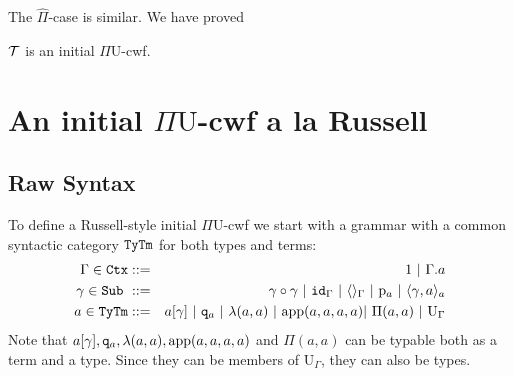 \documentclass{lmcs}
\def\UU{\mathrm{U}}
\def\Pihat{\hat{\Pi}}
\begin{document}
The $\Pihat$-case is similar. We have proved
\begin{thm}\label{theom:initial_cwf}
  ${\mathcal T}$ is an initial $\Pi\UU$-cwf.
\end{thm}

%

\section{An initial $\Pi \UU$-cwf a la Russell}

\subsection{Raw Syntax}
To define a Russell-style initial $\Pi\UU$-cwf we start with a grammar with a common syntactic category ${\tt Ty}{\tt Tm}$ for both types and terms:
\begin{eqnarray*}
\Gamma \in \RawCtx &::=& 1  \ |\ \Gamma.a\\
\gamma \in \RawSub \ &::=& \gamma \circ \gamma \ |\ \id_\Gamma \ |\ \langle\rangle_\Gamma \ |\ \p_{a} \ |\ \langle \gamma, a \rangle_a\\
a \in \RawTy\RawTm &::=& a [\gamma] \ |\ \qI_a\  |\   \lambda(a,a) \ |\ 
\ap(a,a,a,a) |\  \Pi(a,a)  \ |\  \UU_\Gamma
\end{eqnarray*}
Note that $a [\gamma],{\tt q}_a,\lambda(a,a),\mathrm{app}(a,a,a,a)$ and $\Pi(a,a)$ can be typable both as a term and a type. Since they can be members of $\UU_\Gamma$, they can also be types.
\end{document}
